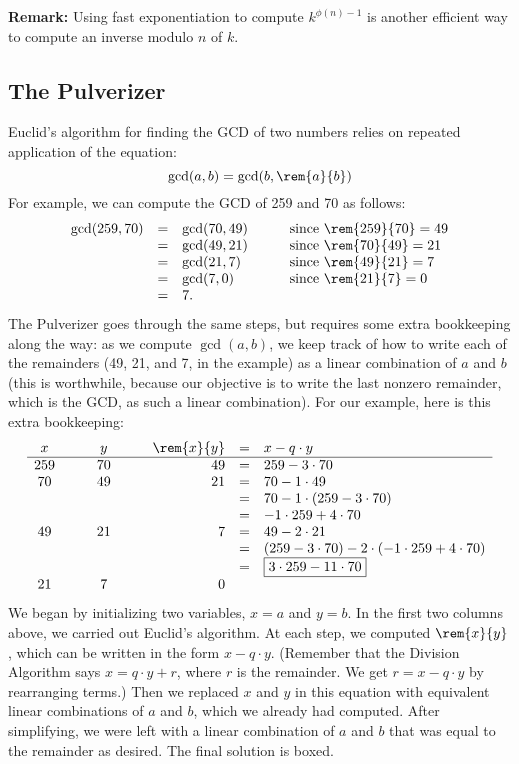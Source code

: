 \textbf{Remark:} Using fast exponentiation to compute $k^{\phi(n)-1}$ is
another efficient way to compute an inverse modulo $n$ of $k$.

\subsection*{The Pulverizer}

Euclid's algorithm for finding the GCD of two numbers relies on
repeated application of the equation: 
\[
\gcd(a, b) = \gcd(b, \rem{a}{b})
\]
For example, we can compute the GCD of 259 and 70 as follows:
\[
\begin{array}{rclcl}
\gcd(259, 70)
    & = & \gcd(70, 49) & \quad & \text{since $\rem{259}{70} = 49$}\\
    & = & \gcd(49, 21) && \text{since $\rem{70}{49} = 21$} \\
    & = & \gcd(21, 7) && \text{since $\rem{49}{21} = 7$} \\
    & = & \gcd(7, 0) && \text{since $\rem{21}{7} = 0$} \\
    & = & 7.
\end{array}
\]
The Pulverizer goes through the same steps, but requires some extra
bookkeeping along the way: as we compute $\gcd(a, b)$, we keep track
of how to write each of the remainders (49, 21, and 7, in the example)
as a linear combination of $a$ and $b$ (this is worthwhile, because
our objective is to write the last nonzero remainder, which is the
GCD, as such a linear combination).  For our example, here is this
extra bookkeeping:
\[
\begin{array}{ccccrcl}
x & \quad & y & \quad & \rem{x}{y} & = & x - q \cdot y \\ \hline
259 && 70 && 49 & = &   259 - 3 \cdot 70 \\
70 && 49 && 21  & = &   70 - 1 \cdot 49 \\
&&&&            & = &   70 - 1 \cdot (259 - 3 \cdot 70) \\
&&&&            & = &   -1 \cdot 259 + 4 \cdot 70 \\
49 && 21 && 7   & = &   49 - 2 \cdot 21 \\
&&&&            & = &   (259 - 3 \cdot 70) -
                                2 \cdot (-1 \cdot 259 + 4 \cdot 70) \\
&&&&            & = &   \fbox{$3 \cdot 259 - 11 \cdot 70$} \\
21 && 7 && 0
\end{array}
\]
We began by initializing two variables, $x = a$ and $y = b$.  In the
first two columns above, we carried out Euclid's algorithm.  At each
step, we computed $\rem{x}{y}$, which can be written in the form $x - q
\cdot y$.  (Remember that the Division Algorithm says $x = q \cdot y +
r$, where $r$ is the remainder.  We get $r = x - q \cdot y$ by
rearranging terms.)  Then we replaced $x$ and $y$ in this equation
with equivalent linear combinations of $a$ and $b$, which we already
had computed.  After simplifying, we were left with a linear
combination of $a$ and $b$ that was equal to the remainder as desired.
The final solution is boxed.


